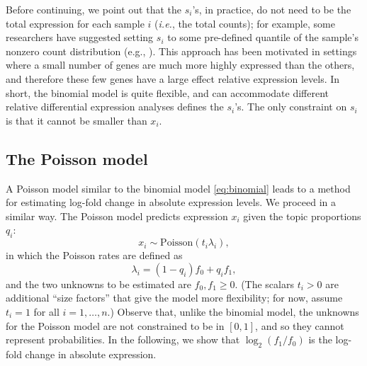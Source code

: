 \documentclass[final]{siamart171218}
\begin{document}
Before continuing, we point out that the $s_i$'s, in practice, do not
need to be the total expression for each sample $i$ ({\em i.e.}, the
total counts); for example, some researchers have suggested setting
$s_i$ to some pre-defined quantile of the sample's nonzero count
distribution (e.g., \cite{bullard-2010}). This approach has been
motivated in settings where a small number of genes are much more
highly expressed than the others, and therefore these few genes have a
large effect relative expression levels. In short, the binomial model
is quite flexible, and can accommodate different relative differential
expression analyses defines the $s_i$'s. The only constraint on $s_i$
is that it cannot be smaller than $x_i$.

\subsection{The Poisson model}

A Poisson model similar to the binomial model \eqref{eq:binomial}
leads to a method for estimating log-fold change in absolute
expression levels. We proceed in a similar way. The Poisson model
predicts expression $x_i$ given the topic proportions $q_i$:
\begin{equation}
x_i \sim \mathrm{Poisson}(t_i \lambda_i),
\label{eq:poisson}
\end{equation}
in which the Poisson rates are defined as
\begin{equation}
\lambda_i = (1 - q_i) f_0 + q_i f_1,
\end{equation}
and the two unknowns to be estimated are $f_0, f_1 \geq 0$. (The
scalars $t_i > 0$ are additional ``size factors'' that give the model
more flexibility; for now, assume $t_i = 1$ for all $i = 1, \ldots,
n$.) Observe that, unlike the binomial model, the unknowns for the
Poisson model are not constrained to be in $[0, 1]$, and so they
cannot represent probabilities. In the following, we show that
$\log_2(f_1/f_0)$ is the log-fold change in absolute expression.
\end{document}
